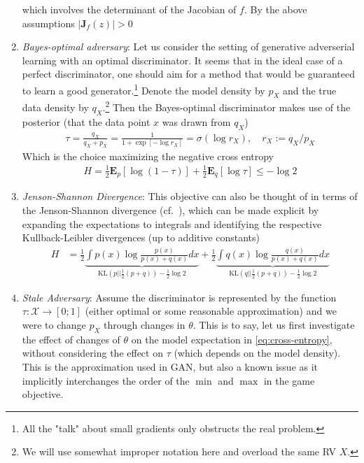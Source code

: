 \documentclass{article}
\newcommand{\J}{{\mathbf J}}
\newcommand{\Edata}{\E_{q}}
\newcommand{\Emodel}{\E_{p}}
\newcommand{\E}{{\mathbf E}}
\begin{document}
\begin{enumerate}
which involves the determinant of the Jacobian of $f$. By the above assumptions $\left| \J_f (z)\right| >0$
\item \textit{Bayes-optimal adversary}: Let us consider the setting of generative adverserial learning with an optimal discriminator. It seems that in the ideal case of a perfect discriminator, one should aim for a method that would be guaranteed to learn a good generator.\footnote{All the "talk"  about small gradients only obstructs the real problem.} Denote the model density by $p_X$ and the true data density by $q_X$.\footnote{We will use somewhat improper notation here and overload the same RV $X$.} Then the Bayes-optimal discriminator makes use of the posterior (that the data point $x$ was drawn from $q_X$)
\begin{align}
\tau =  \frac{q_X}{q_X+p_X} = \frac{1}{1+ \exp\left[- \log r_X \right]} = \sigma\left(\log r_X \right), \quad 
r_X := q_X/p_X
\end{align}
Which is the choice maximizing the negative cross entropy
\begin{align}
H = \frac 12 \Emodel \left[ \log (1-\tau)  \right] + \frac 12 \Edata \left[ \log \tau \right] \le - \log 2
\label{eq:cross-entropy}
\end{align}
\item \textit{Jenson-Shannon  Divergence}: This objective can also be thought of in terms of the Jenson-Shannon divergence (cf.~\cite{goodfellow2014generative}), which can be made explicit by expanding the expectations to integrals and identifying the respective Kullback-Leibler divergences (up to additive constants)
\begin{align}
H  & = 
\frac 12
 \underbrace{\int p(x) \log \frac{p(x)}{p(x) + q(x)} dx}_{\text{KL}(p|| \frac 12 (p+q))- \frac 12 \log 2}
 + \frac 12 
 \underbrace{\int q(x)\log \frac{q(x)}{p(x) + q(x)}dx}_{\text{KL}(q|| \frac 12 (p+q))- \frac 12 \log 2}
\end{align}
\item \textit{Stale Adversary}: Assume the discriminator is represented by the function $\tau: \mathcal X \to [0;1]$ (either optimal or some reasonable approximation) and we were to change $p_X$ through changes in $\theta$. This is to say, let us first investigate the effect of changes of $\theta$ on the model expectation in \eqref{eq:cross-entropy}, without considering the effect on $\tau$ (which depends on the model density). This is the approximation used in GAN, but also a known issue as it implicitly interchanges the order of the $\min$ and $\max$ in the game objective. 

\end{enumerate}
\end{document}
